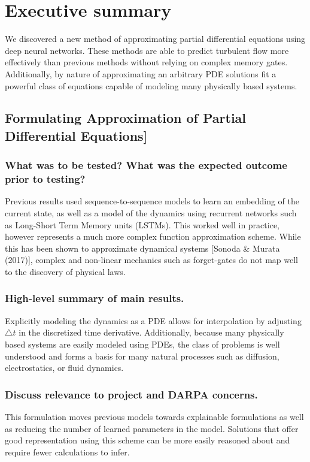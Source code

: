 \documentclass[12pt]{article}
\theoremstyle{plain}
\theoremstyle{remark}
\theoremstyle{definition}
\begin{document}


\section{Executive summary}

We discovered a new method of approximating partial differential equations using deep neural networks. These methods are able to predict turbulent flow more effectively than previous methods without relying on complex memory gates. Additionally, by nature of approximating an arbitrary PDE solutions fit a powerful class of equations capable of modeling many physically based systems.

\subsection{Formulating Approximation of Partial Differential Equations]}

\subsubsection{What was to be tested? What was the expected outcome prior to testing?}
Previous results used sequence-to-sequence models to learn an embedding of the current state, as well as a model of the dynamics using recurrent networks such as Long-Short Term Memory units (LSTMs). This worked well in practice, however represents a much more complex function approximation scheme. While this has been shown to approximate dynamical systems [Sonoda \& Murata (2017)], complex and non-linear mechanics such as forget-gates do not map well to the discovery of physical laws.

\subsubsection{High-level summary of main results.}
Explicitly modeling the dynamics as a PDE allows for interpolation by adjusting $\bigtriangleup t$ in the discretized time derivative. Additionally, because many physically based systems are easily modeled using PDEs, the class of problems is well understood and forms a basis for many natural processes such as diffusion, electrostatics, or fluid dynamics.

\subsubsection{Discuss relevance to project and DARPA concerns.}
This formulation moves previous models towards explainable formulations as well as reducing the number of learned parameters in the model. Solutions that offer good representation using this scheme can be more easily reasoned about and require fewer calculations to infer.
\end{document}
